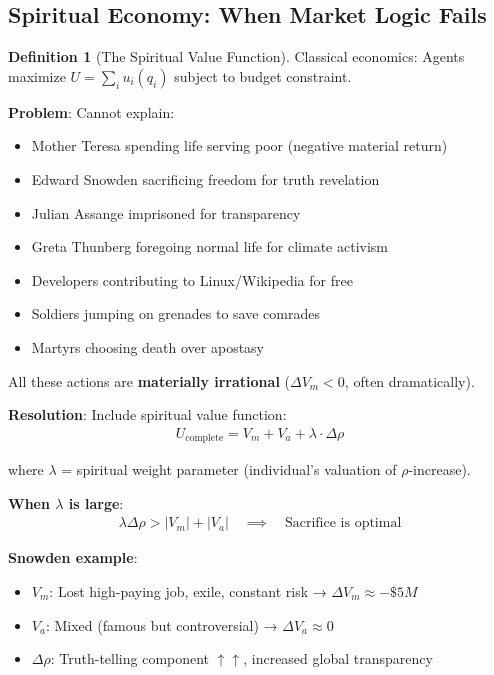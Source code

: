 \documentclass[11pt,a4paper]{article}
\theoremstyle{definition}
\newtheorem{definition}{Definition}[section]
\theoremstyle{remark}
\begin{document}
\begin{enumerate}
\subsection{Spiritual Economy: When Market Logic Fails}

\begin{definition}[The Spiritual Value Function]
Classical economics: Agents maximize \(U = \sum_i u_i(q_i)\) subject to budget constraint.

\textbf{Problem}: Cannot explain:
\begin{itemize}
    \item Mother Teresa spending life serving poor (negative material return)
    \item Edward Snowden sacrificing freedom for truth revelation
    \item Julian Assange imprisoned for transparency
    \item Greta Thunberg foregoing normal life for climate activism
    \item Developers contributing to Linux/Wikipedia for free
    \item Soldiers jumping on grenades to save comrades
    \item Martyrs choosing death over apostasy
\end{itemize}

All these actions are \textbf{materially irrational} (\(\Delta V_m < 0\), often dramatically).

\textbf{Resolution}: Include spiritual value function:
\begin{align}
U_{\text{complete}} = V_m + V_a + \lambda \cdot \Delta\rho
\end{align}

where \(\lambda\) = spiritual weight parameter (individual's valuation of \(\rho\)-increase).

\textbf{When \(\lambda\) is large}:
\begin{align}
\lambda \Delta\rho > |V_m| + |V_a| \quad \implies \quad \text{Sacrifice is optimal}
\end{align}

\textbf{Snowden example}:
\begin{itemize}
    \item \(V_m\): Lost high-paying job, exile, constant risk → \(\Delta V_m \approx -\$5M\)
    \item \(V_a\): Mixed (famous but controversial) → \(\Delta V_a \approx 0\)
    \item \(\Delta\rho\): Truth-telling component \(\uparrow\uparrow\), increased global transparency
\end{itemize}


\end{definition}
\end{enumerate}
\end{document}
